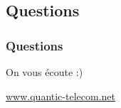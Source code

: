 \documentclass[handout]{beamer}
\begin{document}
	\subsection{Questions}
		\begin{frame}
		\frametitle{Questions}
		\huge{On vous écoute :)}
		\vspace{40px}
		\begin{center}
		\end{center}
		\begin{center}
			\small{\underline{www.quantic-telecom.net}}
		\end{center}
		\end{frame}


\end{document}
